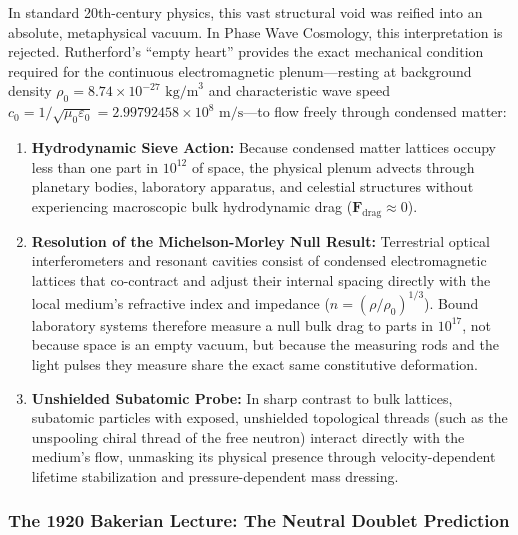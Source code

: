 \documentclass[11pt,a4paper]{article}
\begin{document}
In standard 20th-century physics, this vast structural void was reified into an absolute, metaphysical vacuum. In Phase Wave Cosmology, this interpretation is rejected. Rutherford's ``empty heart'' provides the exact mechanical condition required for the continuous electromagnetic plenum---resting at background density $\rho_0 = 8.74 \times 10^{-27}\text{ kg/m}^3$ and characteristic wave speed $c_0 = 1/\sqrt{\mu_0\varepsilon_0} = 2.99792458 \times 10^8\text{ m/s}$---to flow freely through condensed matter:
\begin{enumerate}
    \item \textbf{Hydrodynamic Sieve Action:} Because condensed matter lattices occupy less than one part in $10^{12}$ of space, the physical plenum advects through planetary bodies, laboratory apparatus, and celestial structures without experiencing macroscopic bulk hydrodynamic drag ($\mathbf{F}_{\text{drag}} \approx 0$).
    \item \textbf{Resolution of the Michelson-Morley Null Result:} Terrestrial optical interferometers and resonant cavities consist of condensed electromagnetic lattices that co-contract and adjust their internal spacing directly with the local medium's refractive index and impedance ($n = (\rho/\rho_0)^{1/3}$). Bound laboratory systems therefore measure a null bulk drag to parts in $10^{17}$, not because space is an empty vacuum, but because the measuring rods and the light pulses they measure share the exact same constitutive deformation.
    \item \textbf{Unshielded Subatomic Probe:} In sharp contrast to bulk lattices, subatomic particles with exposed, unshielded topological threads (such as the unspooling chiral thread of the free neutron) interact directly with the medium's flow, unmasking its physical presence through velocity-dependent lifetime stabilization and pressure-dependent mass dressing.
\end{enumerate}

\subsubsection{The 1920 Bakerian Lecture: The Neutral Doublet Prediction}
\label{subsubsec:rutherford_1920_bakerian}
\end{document}
